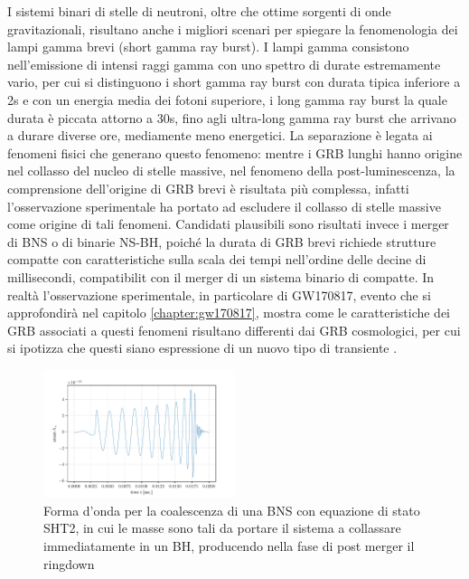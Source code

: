 I sistemi binari di stelle di neutroni, oltre che ottime sorgenti di onde gravitazionali, risultano anche i migliori scenari per spiegare la fenomenologia dei lampi gamma brevi (short gamma ray burst). I lampi gamma consistono nell'emissione di intensi raggi gamma con uno spettro di durate estremamente vario, per cui si distinguono i short gamma ray burst con durata tipica inferiore a 2s e con un energia media dei fotoni superiore, i long gamma ray burst la quale durata è piccata attorno a 30s, fino agli ultra-long gamma ray burst che arrivano a durare diverse ore, mediamente meno energetici. 
La separazione è legata ai fenomeni fisici che generano questo fenomeno: mentre i GRB lunghi hanno origine nel collasso del nucleo di stelle massive, nel fenomeno della post-luminescenza, la comprensione dell'origine di GRB brevi è risultata più complessa, infatti l'osservazione sperimentale ha portato ad escludere il collasso di stelle massive come origine di tali fenomeni. Candidati plausibili sono risultati invece i merger di BNS o di binarie NS-BH, poiché la durata di GRB brevi richiede strutture compatte con caratteristiche sulla scala dei tempi nell'ordine delle decine di millisecondi, compatibilit con il merger di un sistema binario di compatte. In realtà l'osservazione sperimentale, in particolare di GW170817, evento che si approfondirà nel capitolo \ref{chapter:gw170817}, mostra come le caratteristiche dei GRB associati a questi fenomeni risultano differenti dai GRB cosmologici, per cui si ipotizza che questi siano espressione di un nuovo tipo di transiente \cite{maggiore2018gravitational}.

\begin{figure}
	\vspace{-50pt}
	\begin{center}
		\includegraphics[width=0.5\textwidth]{figures/Capitolo_1/SHT2.2.pdf}
	\end{center}
	\vspace{-10pt}
	\caption{Forma d'onda per la coalescenza di una BNS con equazione di stato SHT2, in cui le masse sono tali da portare il sistema a collassare immediatamente in un BH, producendo nella fase di post merger il ringdown}
	\label{fig:FormaOndaBH}
	\vspace{-30pt}
\end{figure}
